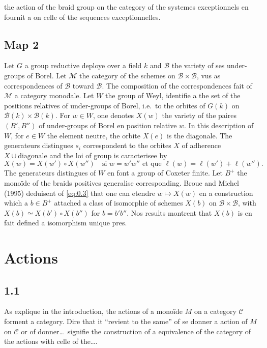 \documentclass[11pt,a4paper]{article}
\theoremstyle{plain}
\theoremstyle{definition}
\newcommand{\cC}{\mathscr{C}}
\newcommand{\cM}{\mathscr{M}}
\begin{document}
the action of the braid group on the category of the systemes exceptionnels en fournit a on celle of the sequences exceptionnelles.

\subsection*{Map 2}

Let $G$ a group reductive deploye over a field $k$ and $\mathcal{B}$ the variety of ses under-groups of Borel. Let $\cM$ the category of the schemes on $\mathcal{B} \times \mathcal{B}$, vus as correspondences of $\mathcal{B}$ toward $\mathcal{B}$. The composition of the correspondences fait of $\cM$ a category mono\"dale. Let $W$ the group of Weyl, identifie a the set of the positions relatives of under-groups of Borel, i.e.\ to the orbites of $G(k)$ on $\mathcal{B}(k) \times \mathcal{B}(k)$. For $w \in W$, one denotes $X(w)$ the variety of the paires $(B', B'')$ of under-groups of Borel en position relative $w$. In this description of $W$, for $e \in W$ the element neutre, the orbite $X(e)$ is the diagonale. The generateurs distingues $s_i$ correspondent to the orbites $X$ of adherence $X \cup \text{diagonale}$ and the loi of group is caracterisee by
\begin{equation}\label{eq:0.3}
X(w) = X(w') \circ X(w'') \quad \text{si } w = w'w'' \text{ et que } \ell(w) = \ell(w') + \ell(w'').
\tag{0.3}
\end{equation}
The generateurs distingues of $W$ en font a group of Coxeter finite. Let $B^+$ the mono\"ide of the braids positives generalise corresponding. Broue and Michel (1995) deduisent of \eqref{eq:0.3} that one can etendre $w \mapsto X(w)$ en a construction which a $b \in B^+$ attached a class of isomorphie of schemes $X(b)$ on $\mathcal{B} \times \mathcal{B}$, with $X(b) \simeq X(b') \circ X(b'')$ for $b = b'b''$. Nos results montrent that $X(b)$ is en fait defined a isomorphism unique pres.

\section{Actions}\label{sec:actions}

\subsection*{1.1}

As explique in the introduction, the actions of a mono\"ide $M$ on a category $\cC$ forment a category. Dire that it ``revient to the same'' of se donner a action of $M$ on $\cC$ or of donner\ldots\ signifie the construction of a equivalence of the category of the actions with celle of the\ldots.
\end{document}
